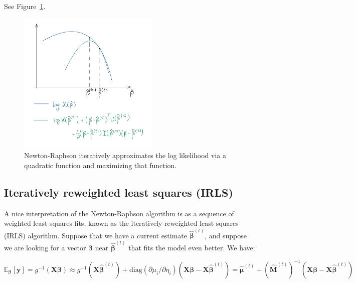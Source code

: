 \documentclass[
  11pt,
  letterpaper,
  oneside]{book}
\theoremstyle{plain}
\theoremstyle{plain}
\theoremstyle{definition}
\theoremstyle{definition}
\theoremstyle{plain}
\theoremstyle{remark}
\begin{document}
See Figure~\ref{fig-newton-raphson}.

\begin{figure}

{\centering \includegraphics[width=0.6\textwidth,height=\textheight]{figures/newton-raphson.jpeg}

}

\caption{\label{fig-newton-raphson}Newton-Raphson iteratively
approximates the log likelihood via a quadratic function and maximizing
that function.}

\end{figure}

\hypertarget{sec-irls-interpretation}{%
\subsection{Iteratively reweighted least squares
(IRLS)}\label{sec-irls-interpretation}}

A nice interpretation of the Newton-Raphson algorithm is as a sequence
of weighted least squares fits, known as the iteratively reweighted
least squares (IRLS) algorithm. Suppose that we have a current estimate
\(\boldsymbol{\widehat \beta}^{(t)}\), and suppose we are looking for a
vector \(\boldsymbol{\beta}\) near \(\boldsymbol{\widehat \beta}^{(t)}\)
that fits the model even better. We have:

\[
\mathbb{E}_{\boldsymbol{\beta}}[\boldsymbol{y}] = g^{-1}(\boldsymbol{X} \boldsymbol{\beta}) \approx g^{-1}(\boldsymbol{X} \boldsymbol{\widehat \beta}^{(t)}) + \text{diag}(\partial \mu_i/\partial \eta_i)(\boldsymbol{X} \boldsymbol{\beta} - \boldsymbol{X} \boldsymbol{\widehat \beta}^{(t)}) = \boldsymbol{\widehat \mu}^{(t)} + (\boldsymbol{\widehat M}^{(t)})^{-1}(\boldsymbol{X} \boldsymbol{\beta} - \boldsymbol{X} \boldsymbol{\widehat \beta}^{(t)})
\]
\end{document}
